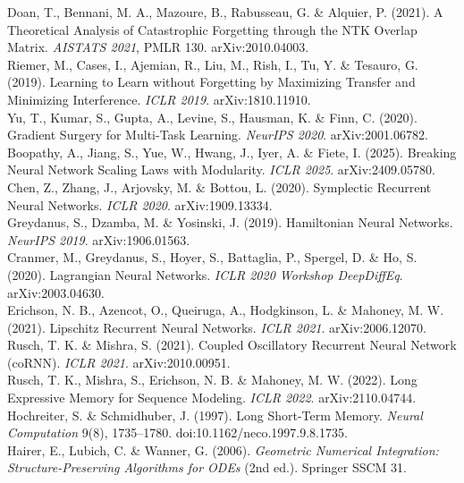 \documentclass[11pt]{article}
\begin{document}
Doan, T., Bennani, M. A., Mazoure, B., Rabusseau, G. \& Alquier, P. (2021). A Theoretical Analysis of Catastrophic Forgetting through the NTK Overlap Matrix. \emph{AISTATS 2021}, PMLR 130. arXiv:2010.04003.\\
Riemer, M., Cases, I., Ajemian, R., Liu, M., Rish, I., Tu, Y. \& Tesauro, G. (2019). Learning to Learn without Forgetting by Maximizing Transfer and Minimizing Interference. \emph{ICLR 2019}. arXiv:1810.11910.\\
Yu, T., Kumar, S., Gupta, A., Levine, S., Hausman, K. \& Finn, C. (2020). Gradient Surgery for Multi-Task Learning. \emph{NeurIPS 2020}. arXiv:2001.06782.\\
Boopathy, A., Jiang, S., Yue, W., Hwang, J., Iyer, A. \& Fiete, I. (2025). Breaking Neural Network Scaling Laws with Modularity. \emph{ICLR 2025}. arXiv:2409.05780.\\
Chen, Z., Zhang, J., Arjovsky, M. \& Bottou, L. (2020). Symplectic Recurrent Neural Networks. \emph{ICLR 2020}. arXiv:1909.13334.\\
Greydanus, S., Dzamba, M. \& Yosinski, J. (2019). Hamiltonian Neural Networks. \emph{NeurIPS 2019}. arXiv:1906.01563.\\
Cranmer, M., Greydanus, S., Hoyer, S., Battaglia, P., Spergel, D. \& Ho, S. (2020). Lagrangian Neural Networks. \emph{ICLR 2020 Workshop DeepDiffEq}. arXiv:2003.04630.\\
Erichson, N. B., Azencot, O., Queiruga, A., Hodgkinson, L. \& Mahoney, M. W. (2021). Lipschitz Recurrent Neural Networks. \emph{ICLR 2021}. arXiv:2006.12070.\\
Rusch, T. K. \& Mishra, S. (2021). Coupled Oscillatory Recurrent Neural Network (coRNN). \emph{ICLR 2021}. arXiv:2010.00951.\\
Rusch, T. K., Mishra, S., Erichson, N. B. \& Mahoney, M. W. (2022). Long Expressive Memory for Sequence Modeling. \emph{ICLR 2022}. arXiv:2110.04744.\\
Hochreiter, S. \& Schmidhuber, J. (1997). Long Short-Term Memory. \emph{Neural Computation} 9(8), 1735--1780. doi:10.1162/neco.1997.9.8.1735.\\
Hairer, E., Lubich, C. \& Wanner, G. (2006). \emph{Geometric Numerical Integration: Structure-Preserving Algorithms for ODEs} (2nd ed.). Springer SSCM 31.
\end{document}
